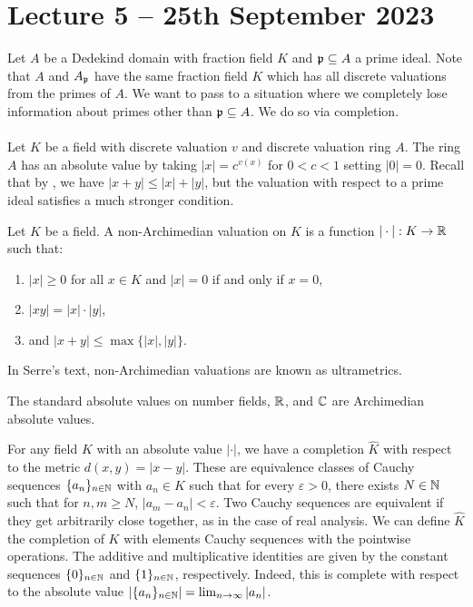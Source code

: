 \section{Lecture 5 -- 25th September 2023}
Let $A$ be a Dedekind domain with fraction field $K$ and $\mathfrak{p}\subseteq A$ a prime ideal. Note that $A$ and $A_{\mathfrak{p}}$ have the same fraction field $K$ which has all discrete valuations from the primes of $A$. We want to pass to a situation where we completely lose information about primes other than $\mathfrak{p}\subseteq A$. We do so via completion. 
\\\\
Let $K$ be a field with discrete valuation $v$ and discrete valuation ring $A$. The ring $A$ has an absolute value by taking $|x|=c^{v(x)}$ for $0<c<1$ setting $|0|=0$. Recall that by , we have $|x+y|\leq|x|+|y|$, but the valuation with respect to a prime ideal satisfies a much stronger condition. 
\begin{definition}\label{def:nonarchimedian valuation}
  Let $K$ be a field. A non-Archimedian valuation on $K$ is a function $|\cdot|:K\to\mathbb{R}$ such that:
  \begin{enumerate}[label=(\alph*)]
    \item $|x|\geq0$ for all $x\in K$ and $|x|=0$ if and only if $x=0$, 
    \item $|xy|=|x|\cdot|y|$, 
    \item and $|x+y|\leq\max\{|x|,|y|\}$. 
  \end{enumerate}
\end{definition}
\begin{remark}
  In Serre's text, non-Archimedian valuations are known as ultrametrics. 
\end{remark}
\begin{remark}
  The standard absolute values on number fields, $\mathbb{R}$, and $\mathbb{C}$ are Archimedian absolute values. 
\end{remark}
For any field $K$ with an absolute value $|\cdot|$, we have a completion $\widehat{K}$ with respect to the metric $d(x,y)=|x-y|$. These are equivalence classes of Cauchy sequences $\{a_{n}\}_{n\in\mathbb{N}}$ with $a_{n}\in K$ such that for every $\varepsilon>0$, there exists $N\in \mathbb{N}$ such that for $n,m\geq N$, $|a_{m}-a_{n}|<\varepsilon$. Two Cauchy sequences are equivalent if they get arbitrarily close together, as in the case of real analysis. We can define $\widehat{K}$ the completion of $K$ with elements Cauchy sequences with the pointwise operations. The additive and multiplicative identities are given by the constant sequences $\{0\}_{n\in\mathbb{N}}$ and $\{1\}_{n\in\mathbb{N}}$, respectively. Indeed, this is complete with respect to the absolute value $|\{a_{n}\}_{n\in\mathbb{N}}|=\lim_{n\to\infty}|a_{n}|$. 
